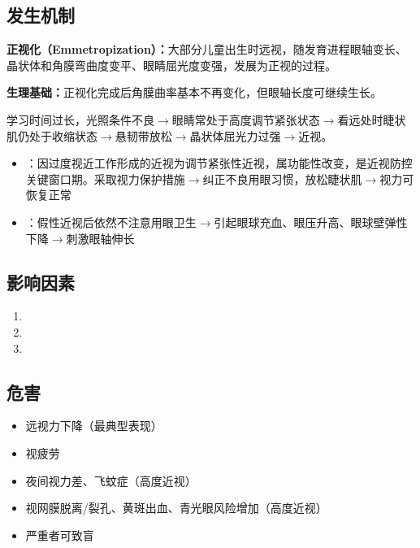 \subsection{发生机制}

\begin{keybox}
\textbf{正视化（Emmetropization）：}大部分儿童出生时远视，随发育进程眼轴变长、晶状体和角膜弯曲度变平、眼睛屈光度变强，发展为正视的过程。

\textbf{生理基础：}正视化完成后角膜曲率基本不再变化，但眼轴长度可继续生长。

学习时间过长，光照条件不良$\rightarrow$眼睛常处于高度调节紧张状态$\rightarrow$看远处时睫状肌仍处于收缩状态$\rightarrow$悬韧带放松$\rightarrow$晶状体屈光力过强$\rightarrow$近视。

\begin{itemize}[leftmargin=*]
    \item {}：因过度视近工作形成的近视为调节紧张性近视，属功能性改变，是近视防控关键窗口期。采取视力保护措施$\rightarrow$纠正不良用眼习惯，放松睫状肌$\rightarrow$视力可恢复正常
    \item {}：假性近视后依然不注意用眼卫生$\rightarrow$引起眼球充血、眼压升高、眼球壁弹性下降$\rightarrow$刺激眼轴伸长
\end{itemize}
\end{keybox}

\subsection{影响因素}

\begin{keybox}
\begin{enumerate}[leftmargin=*]
    \item {}
    \item {}
    \item {}
\end{enumerate}
\end{keybox}

\subsection{危害}

\begin{keybox}
\begin{itemize}[leftmargin=*]
    \item 远视力下降（最典型表现）
    \item 视疲劳
    \item 夜间视力差、飞蚊症（高度近视）
    \item 视网膜脱离/裂孔、黄斑出血、青光眼风险增加（高度近视）
    \item 严重者可致盲
\end{itemize}
\end{keybox}

